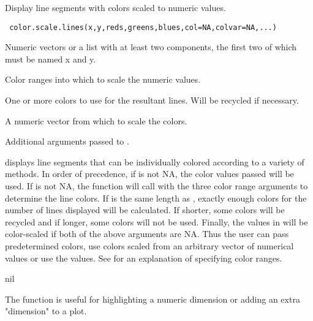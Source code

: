 \begin{Description}\relax
Display line segments with colors scaled to numeric values.
\end{Description}
\begin{Usage}
\begin{verbatim}
 color.scale.lines(x,y,reds,greens,blues,col=NA,colvar=NA,...)
\end{verbatim}
\end{Usage}
\begin{Arguments}
\begin{ldescription}
\item[\code{x,y}] Numeric vectors or a list with at least two components,
the first two of which must be named x and y.
\item[\code{reds,greens,blues}] Color ranges into which to scale the
numeric values.
\item[\code{col}] One or more colors to use for the resultant lines. Will
be recycled if necessary.
\item[\code{colvar}] A numeric vector from which to scale the colors.
\item[\code{...}] Additional arguments passed to .
\end{ldescription}
\end{Arguments}
\begin{Details}\relax
{} displays line segments that can be individually
colored according to a variety of methods. In order of precedence, if
 is not NA, the color values passed will be used. If
 is not NA, the function will call  with
the three color range arguments to determine the line colors. If
 is the same length as , exactly enough 
colors for the number of lines displayed will be calculated. If shorter,
some colors will be recycled and if longer, some colors will not be used.
Finally, the values in  will be color-scaled if both of the above
arguments are NA. Thus the user can pass predetermined colors, use colors
scaled from an arbitrary vector of numerical values or use the 
values. See  for an explanation of specifying color
ranges.
\end{Details}
\begin{Value}
nil
\end{Value}
\begin{Note}\relax
The function is useful for highlighting a numeric dimension or adding
an extra "dimension" to a plot.
\end{Note}
